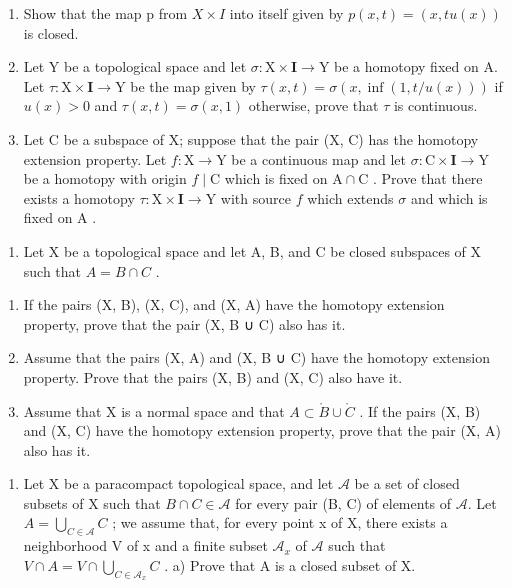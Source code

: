 \begin{enumerate}
\def\labelenumi{\alph{enumi})}
\item
  Show that the map p from \(X \times I\) into itself given by \(p(x,t) = (x,tu(x))\) is closed.
\item
  Let Y be a topological space and let \(\sigma\colon\mathrm{X}\times\mathbf{I}\to\mathrm{Y}\) be a homotopy fixed on A. Let \(\tau\colon\mathrm{X}\times\mathbf{I}\to\mathrm{Y}\) be the map given by \(\tau(x,t)=\sigma(x,\inf(1,t/u(x)))\) if \(u(x)>0\) and \(\tau(x,t)=\sigma(x,1)\) otherwise, prove that \(\tau\) is continuous.
\item
  Let C be a subspace of X; suppose that the pair (X, C) has the homotopy extension property. Let \(f \colon \mathrm{X} \to \mathrm{Y}\) be a continuous map and let \(\sigma \colon \mathrm{C} \times \mathbf{I} \to \mathrm{Y}\) be a homotopy with origin \(f \mid \mathrm{C}\) which is fixed on \(\mathrm{A} \cap \mathrm{C}\) . Prove that there exists a homotopy \(\tau \colon \mathrm{X} \times \mathbf{I} \to \mathrm{Y}\) with source \(f\) which extends \(\sigma\) and which is fixed on \(\mathrm{A}\) .
\end{enumerate}

\begin{enumerate}
\def\labelenumi{\arabic{enumi})}
\setcounter{enumi}{19}
\tightlist
\item
  Let X be a topological space and let A, B, and C be closed subspaces of X such that \(A = B \cap C\) .
\end{enumerate}

\begin{enumerate}
\def\labelenumi{\alph{enumi})}
\item
  If the pairs (X, B), (X, C), and (X, A) have the homotopy extension property, prove that the pair (X, B ∪ C) also has it.
\item
  Assume that the pairs (X, A) and (X, B ∪ C) have the homotopy extension property. Prove that the pairs (X, B) and (X, C) also have it.
\item
  Assume that X is a normal space and that \(A \subset \mathring{B} \cup \mathring{C}\) . If the pairs (X, B) and (X, C) have the homotopy extension property, prove that the pair (X, A) also has it.
\end{enumerate}

\begin{enumerate}
\def\labelenumi{\arabic{enumi})}
\setcounter{enumi}{20}
\tightlist
\item
  Let X be a paracompact topological space, and let \(\mathcal{A}\) be a set of closed subsets of X such that \(B \cap C \in \mathcal{A}\) for every pair (B, C) of elements of \(\mathcal{A}\). Let \(A = \bigcup_{C \in \mathcal{A}} C\) ; we assume that, for every point x of X, there exists a neighborhood V of x and a finite subset \(\mathcal{A}_x\) of \(\mathcal{A}\) such that \(V \cap A = V \cap \bigcup_{C \in \mathcal{A}_x} C\) . a) Prove that A is a closed subset of X.
\end{enumerate}

